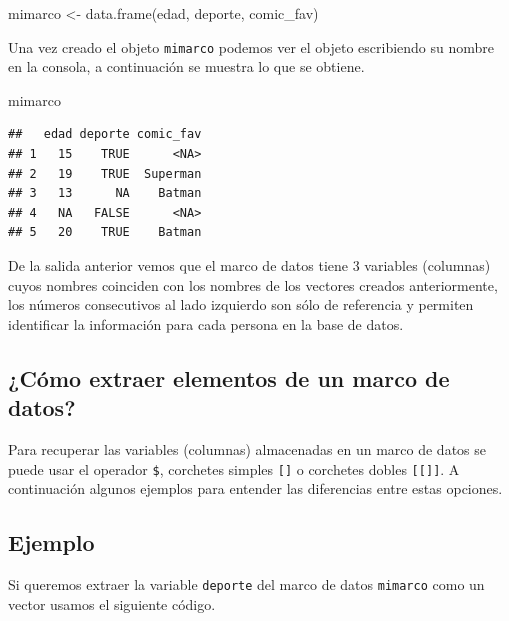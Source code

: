 \documentclass[
]{book}
\makeatletter
\newenvironment{Shaded}{\begin{snugshade}}{\end{snugshade}}
\newcommand{\FunctionTok}[1]{\textcolor[rgb]{0.00,0.00,0.00}{#1}}
\newcommand{\NormalTok}[1]{#1}
\newcommand{\OtherTok}[1]{\textcolor[rgb]{0.56,0.35,0.01}{#1}}
\newenvironment{kframe}{%
\medskip{}
\setlength{\fboxsep}{.8em}
 \def\at@end@of@kframe{}%
 \ifinner\ifhmode%
  \def\at@end@of@kframe{\end{minipage}}%
  \begin{minipage}{\columnwidth}%
 \fi\fi%
 \def\FrameCommand##1{\hskip\@totalleftmargin \hskip-\fboxsep
 \colorbox{shadecolor}{##1}\hskip-\fboxsep
     \hskip-\linewidth \hskip-\@totalleftmargin \hskip\columnwidth}%
 \MakeFramed {\advance\hsize-\width
   \@totalleftmargin\z@ \linewidth\hsize
   \@setminipage}}%
 {\par\unskip\endMakeFramed%
 \at@end@of@kframe}
\renewenvironment{Shaded}{\begin{kframe}}{\end{kframe}}
\makeatother
\begin{document}
\begin{Shaded}
\begin{Highlighting}[]
\NormalTok{mimarco }\OtherTok{\textless{}{-}} \FunctionTok{data.frame}\NormalTok{(edad, deporte, comic\_fav)}
\end{Highlighting}
\end{Shaded}

Una vez creado el objeto \texttt{mimarco} podemos ver el objeto escribiendo su nombre en la consola, a continuación se muestra lo que se obtiene.

\begin{Shaded}
\begin{Highlighting}[]
\NormalTok{mimarco}
\end{Highlighting}
\end{Shaded}

\begin{verbatim}
##   edad deporte comic_fav
## 1   15    TRUE      <NA>
## 2   19    TRUE  Superman
## 3   13      NA    Batman
## 4   NA   FALSE      <NA>
## 5   20    TRUE    Batman
\end{verbatim}

De la salida anterior vemos que el marco de datos tiene 3 variables (columnas) cuyos nombres coinciden con los nombres de los vectores creados anteriormente, los números consecutivos al lado izquierdo son sólo de referencia y permiten identificar la información para cada persona en la base de datos.

\hypertarget{cuxf3mo-extraer-elementos-de-un-marco-de-datos}{%
\subsection{¿Cómo extraer elementos de un marco de datos?}\label{cuxf3mo-extraer-elementos-de-un-marco-de-datos}}

Para recuperar las variables (columnas) almacenadas en un marco de datos se puede usar el operador \texttt{\$}, corchetes simples \texttt{{[}{]}} o corchetes dobles \texttt{{[}{[}{]}{]}}. A continuación algunos ejemplos para entender las diferencias entre estas opciones.

\hypertarget{ejemplo-3}{%
\subsection*{Ejemplo}\label{ejemplo-3}}

Si queremos extraer la variable \texttt{deporte} del marco de datos \texttt{mimarco} como un vector usamos el siguiente código.
\end{document}
